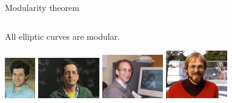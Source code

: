 \documentclass[10pt]{beamer}
\theoremstyle{definition}
\begin{document}
\begin{frame}[t]{Modularity theorem}
\begin{columns}[T]
\end{columns}

\vspace{0.5cm}

\begin{theorem}
All elliptic curves are modular.
\end{theorem}

\begin{center}
\includegraphics[width=0.1\textwidth]{breuil.jpg}
\hspace{0.5cm}
\includegraphics[width=0.2\textwidth]{conrad.jpg}
\hspace{0.5cm}
\includegraphics[width=0.2\textwidth]{diamond.jpg}
\hspace{0.5cm}
\includegraphics[width=0.2\textwidth]{taylor.jpg}
\end{center}

\end{frame}
\end{document}
